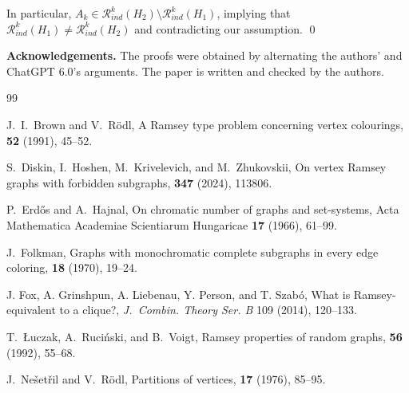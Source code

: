 \documentclass[11pt]{article}
\theoremstyle{plain}
\theoremstyle{definition}
\newcommand{\R}{\mathcal{R}}
\newcommand{\Rk}{\R_{ind}}
\begin{document}
In particular, $A_{k}\in \R_{ind}^{k}(H_2) \setminus \R_{ind}^{k}(H_1)$, implying that  $\Rk^k(H_1)\neq \Rk^k(H_2)$ and  contradicting our assumption.
\qed



    \textbf{Acknowledgements.}  The proofs were obtained by alternating the authors' and ChatGPT 6.0's arguments.  The paper is written and checked by the authors.
 {\hypersetup{linkcolor=cred}
 \newcommand{\etalchar}[1]{$^{#1}$}
 
 
 
 \begin{thebibliography}{99}
 
J.~I.~Brown and V.~R\"odl,
\newblock A Ramsey type problem concerning vertex colourings,
 {\bf 52} (1991), 45--52.


S.~Diskin, I.~Hoshen, M.~Krivelevich, and M.~Zhukovskii,
\newblock On vertex Ramsey graphs with forbidden subgraphs,
 {\bf 347} (2024), 113806.


P.~Erd\H{o}s and A.~Hajnal,
On chromatic number of graphs and set-systems,
Acta Mathematica Academiae Scientiarum Hungaricae
\textbf{17} (1966), 61--99.

J.~Folkman,
\newblock Graphs with monochromatic complete subgraphs in every edge coloring,
 {\bf 18} (1970), 19--24.

  J. Fox, A. Grinshpun, A. Liebenau, Y. Person,  and T. Szab\'o, What is Ramsey-equivalent to a clique?, {\em J.~Combin. Theory Ser. B} 109 (2014), 120--133.

T.~\L uczak, A.~Ruci\'nski, and B.~Voigt,
\newblock Ramsey properties of random graphs,
 {\bf 56} (1992), 55--68.

J.~Ne\v{s}et\v{r}il and V.~R\"odl,
\newblock Partitions of vertices,
 {\bf 17} (1976), 85--95.

\end{thebibliography}
}
\end{document}
